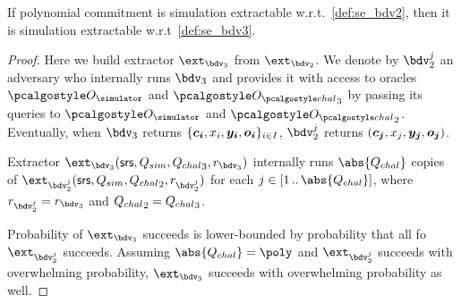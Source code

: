 \documentclass[runningheads,11pt]{llncs}
\let\spvec\vec
\let\vec\accentvec
\let\spvec\vec
\let\vec\spvec
\def\vec#1{\mathchoice{\mbox{\boldmath$\displaystyle#1$}}
  {\mbox{\boldmath$\textstyle#1$}} {\mbox{\boldmath$\scriptstyle#1$}}
  {\mbox{\boldmath$\scriptscriptstyle#1$}}}
\begin{document}
\begin{lemma}[]
  If polynomial commitment is simulation extractable w.r.t.~\cref{def:se_bdv2}, then
  it is simulation extractable w.r.t~\cref{def:se_bdv3}.
\end{lemma}
\begin{proof}
  Here we build extractor $\ext_{\bdv_3}$ from $\ext_{\bdv_2}$. We denote by
  $\bdv_2^j$ an adversary who internally runs $\bdv_3$ and provides it with access to
  oracles $\oracles$ and $\oraclec_3$ by passing its queries to $\oracles$ and
  $\oraclec_2$. Eventually, when $\bdv_3$ returns
  $\smallset{\vec{c_i}, x_i, \vec{y_i}, \vec{o_i}}_{i \in I}$, $\bdv_2^j$ returns
  $(\vec{c_j}, x_j, \vec{y_j}, \vec{o_j})$.

  Extractor $\ext_{\bdv_3} (\srs, \Qsim, \Qchal_3, r_{\bdv_3})$ internally runs $\abs{\Qchal}$
  copies of $\ext_{\bdv_2^j}(\srs, \Qsim, \Qchal_2, r_{\bdv_2^j})$ for each $j \in
  \range{1}{\abs{\Qchal}}$, where $r_{\bdv_2^j} = r_{\bdv_3}$ and ${Q_{chal}}_2 =
  {Q_{chal}}_3$.

  Probability of $\ext_{\bdv_3}$ succeeds is lower-bounded by probability that all fo
  $\ext_{\bdv_2^j}$ succeeds. Assuming $\abs{\Qchal} = \poly$ and $\ext_{\bdv_2^j}$
  succeeds with overwhelming probability, $\ext_{\bdv_3}$ succeeds with overwhelming
  probability as well. 
\end{proof}
\end{document}
